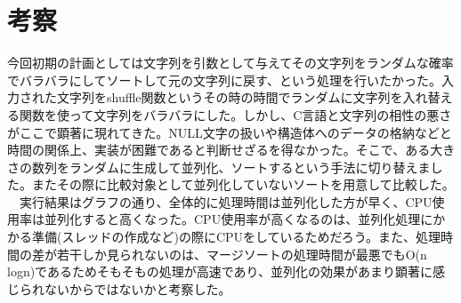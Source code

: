 \documentclass[11pt,a4paper]{jsarticle}
\begin{document}
\section*{考察}
今回初期の計画としては文字列を引数として与えてその文字列をランダムな確率でバラバラにしてソートして元の文字列に戻す、という処理を行いたかった。入力された文字列をshuffle関数というその時の時間でランダムに文字列を入れ替える関数を使って文字列をバラバラにした。しかし、C言語と文字列の相性の悪さがここで顕著に現れてきた。NULL文字の扱いや構造体へのデータの格納などと時間の関係上、実装が困難であると判断せざるを得なかった。そこで、ある大きさの数列をランダムに生成して並列化、ソートするという手法に切り替えました。またその際に比較対象として並列化していないソートを用意して比較した。\\
　実行結果はグラフの通り、全体的に処理時間は並列化した方が早く、CPU使用率は並列化すると高くなった。CPU使用率が高くなるのは、並列化処理にかかる準備(スレッドの作成など)の際にCPUをしているためだろう。また、処理時間の差が若干しか見られないのは、マージソートの処理時間が最悪でもO(n logn)であるためそもそもの処理が高速であり、並列化の効果があまり顕著に感じられないからではないかと考察した。
\end{document}
